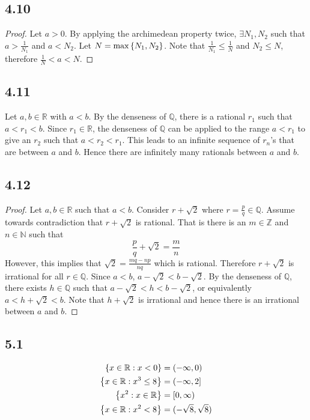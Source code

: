 \documentclass[12pt,titlepage]{extarticle}
\begin{document}
\subsection*{4.10}
\begin{proof}
	Let $a > 0$. By applying the archimedean property twice, $\exists N_1, N_2$ such that $a > \frac{1}{N_1}$ and $a < N_2$. Let $N = \max\qty{N_1, N_2}$. Note that $\frac{1}{N_1} \leq \frac{1}{N}$ and $N_2 \leq N$, therefore $\frac{1}{N} < a < N$.
\end{proof}

\subsection*{4.11}
Let $a,b \in \mathbb{R}$ with $a < b$. By the denseness of $\mathbb{Q}$, there is a rational $r_1$ such that $a < r_1 < b$. Since $r_1 \in \mathbb{R}$, the denseness of $\mathbb{Q}$ can be applied to the range $a < r_1$ to give an $r_2$ such that $a < r_2 < r_1$. This leads to an infinite sequence of $r_n$'s that are between $a$ and $b$. Hence there are infinitely many rationals between $a$ and $b$.

\subsection*{4.12}
\begin{proof}
	Let $a,b \in \mathbb{R}$ such that $a < b$. Consider $r + \sqrt{2}$ where $r = \frac{p}{q} \in \mathbb{Q}$. Assume towards contradiction that $r + \sqrt{2}$ is rational. That is there is an $m \in \mathbb{Z}$ and $n \in \mathbb{N}$ such that
	\[
		\frac{p}{q} + \sqrt{2} = \frac{m}{n}
	\]
	However, this implies that $\sqrt{2} = \frac{mq - np}{nq}$ which is rational. Therefore $r + \sqrt{2}$ is irrational for all $r \in \mathbb{Q}$. Since $a < b$, $a - \sqrt{2} < b - \sqrt{2}$. By the denseness of $\mathbb{Q}$, there exists $h \in \mathbb{Q}$ such that $a - \sqrt{2} < h < b - \sqrt{2}$, or equivalently $a < h + \sqrt{2} < b$. Note that $h + \sqrt{2}$ is irrational and hence there is an irrational between $a$ and $b$.
\end{proof}

\subsection*{5.1}
\begin{align*}
	\qty{x \in \mathbb{R} : x < 0} &= (-\infty, 0) \\
	\qty{x \in \mathbb{R} : x^3 \leq 8} &= (-\infty, 2] \\
	\qty{x^2 : x \in \mathbb{R}} &= [0, \infty) \\
	\qty{x \in \mathbb{R} : x^2 < 8} &= (-\sqrt{8}, \sqrt{8})
\end{align*}
\end{document}
